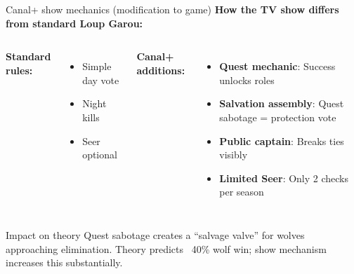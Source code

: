 \documentclass[10pt]{beamer}
\begin{document}
\begin{frame}{Canal+ show mechanics (modification to game)}
  \textbf{How the TV show differs from standard Loup Garou:}

  \vspace{0.3cm}
  \begin{columns}[T]
    \textbf{Standard rules:}
    \begin{itemize}
      \item Simple day vote
      \item Night kills
      \item Seer optional
    \end{itemize}
    
    \textbf{Canal+ additions:}
    \begin{itemize}
      \item \textbf{Quest mechanic}: Success unlocks roles
      \item \textbf{Salvation assembly}: Quest sabotage = protection vote
      \item \textbf{Public captain}: Breaks ties visibly
      \item \textbf{Limited Seer}: Only 2 checks per season
    \end{itemize}
  \end{columns}

  \vspace{0.5cm}
  \begin{alertblock}{Impact on theory}
    Quest sabotage creates a ``salvage valve'' for wolves approaching elimination. Theory predicts ~40\% wolf win; show mechanism increases this substantially.
  \end{alertblock}
\end{frame}
\end{document}
